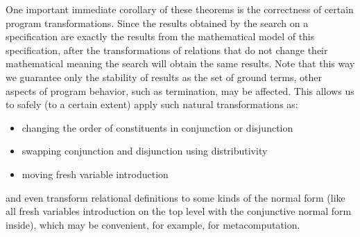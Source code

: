 One important immediate corollary of these theorems is the correctness of certain program transformations. Since the results obtained by the search on a specification are exactly the results from the mathematical model of this specification, after the transformations of relations that do not change their mathematical meaning the search will obtain the same results. Note that this way we guarantee only the stability of results as the set of ground terms, other aspects of program behavior, such as termination, may be affected. This allows us to safely (to a certain extent) apply such natural transformations as:
\begin{itemize}
\item changing the order of constituents in conjunction or disjunction
\item swapping conjunction and disjunction using distributivity
\item moving fresh variable introduction
\end{itemize}
and even transform relational definitions to some kinds of the normal form (like all fresh variables introduction on the top level with the conjunctive normal form inside), which may be convenient, for example, for metacomputation.
